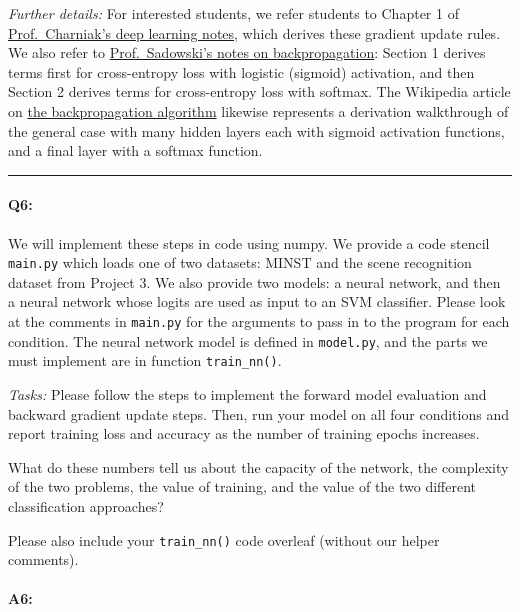 \emph{Further details:} For interested students, we refer students to Chapter 1 of \href{https://cs.brown.edu/courses/csci1460/assets/files/deep-learning.pdf}{Prof.~Charniak's deep learning notes}, which derives these gradient update rules. We also refer to \href{https://www.ics.uci.edu/~pjsadows/notes.pdf}{Prof.~Sadowski's notes on backpropagation}: Section 1 derives terms first for cross-entropy loss with logistic (sigmoid) activation, and then Section 2 derives terms for cross-entropy loss with softmax. The Wikipedia article on \href{https://en.wikipedia.org/wiki/Backpropagation}{the backpropagation algorithm} likewise represents a derivation walkthrough of the general case with many hidden layers each with sigmoid activation functions, and a final layer with a softmax function.

\hspace{\fill}\rule{0.5\linewidth}{.5pt}\hspace{\fill}


\paragraph{Q6:} We will implement these steps in code using numpy. We provide a code stencil \texttt{main.py} which loads one of two datasets: MINST and the scene recognition dataset from Project 3. We also provide two models: a neural network, and then a neural network whose logits are used as input to an SVM classifier. Please look at the comments in \texttt{main.py} for the arguments to pass in to the program for each condition. The neural network model is defined in \texttt{model.py}, and the parts we must implement are in function \texttt{train\_nn()}.

\emph{Tasks:} Please follow the steps to implement the forward model evaluation and backward gradient update steps. Then, run your model on all four conditions and report training loss and accuracy as the number of training epochs increases.

What do these numbers tell us about the capacity of the network, the complexity of the two problems, the value of training, and the value of the two different classification approaches?

Please also include your \texttt{train\_nn()} code overleaf (without our helper comments).
\paragraph{A6:}

